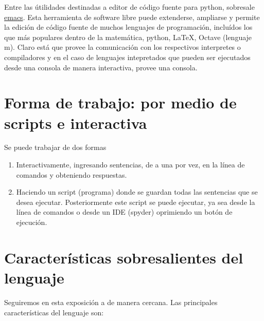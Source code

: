 Entre las útilidades destinadas a editor de código fuente para python, sobresale 
\href{http://www.gnu.org/software/emacs/}{emacs}.
 Esta herramienta de software libre
puede extenderse, ampliarse y permite la edición de código fuente de muchos lenguajes 
de programación, incluídos los que más populares dentro de la matemática, python, \LaTeX, 
Octave (lenguaje m). Claro está que provee la comunicación con los respectivos interpretes 
o compiladores y en el caso de lenguajes intepretados que pueden ser ejecutados desde una 
consola de manera interactiva, provee una consola.

\section{Forma de trabajo: por medio de scripts e interactiva}


Se puede trabajar de dos formas

\begin{enumerate}
\item Interactivamente, ingresando sentencias, de a una por vez, en la línea de comandos y obteniendo respuestas.

\item Haciendo un script (programa) donde se guardan todas las sentencias que se desea ejecutar. Posteriormente este script se puede ejecutar, ya sea desde la línea de comandos o desde un IDE (spyder) oprimiendo un botón de ejecución.

\end{enumerate}





\section{Características sobresalientes del lenguaje}

Seguiremos en esta exposición a \cite{wiki_python} de manera cercana. \link
Las principales características del lenguaje son:

